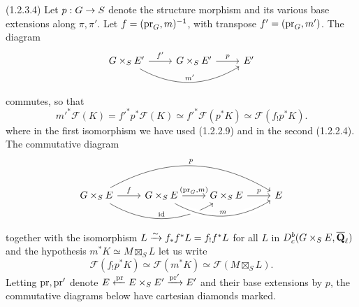 \documentclass[deligne.tex]{subfiles}
\begin{document}
(1.2.3.4) Let $p:G\rightarrow S$ denote the structure morphism and its various base
extensions along $\pi,\pi'$.
Let $f=(\operatorname{pr}_G,m)^{-1}$, with transpose $f'=(\operatorname{pr}_G,m')$. The diagram
\begin{equation*}\begin{tikzcd}
	G\times_SE'\arrow[r,"f'"]\arrow[rr,"m'",bend right]&G\times_SE'\arrow[r,"p"]&E'
\end{tikzcd}\end{equation*}
commutes, so that
\begin{equation*}
	m'^*\mathscr F(K)=f'^*p^*\mathscr F(K)
	\simeq f'^*\mathscr F(p^*K)
	\simeq\mathscr F(f_!p^*K).
\end{equation*}
where in the first isomorphism we have used (1.2.2.9) and in the second
(1.2.2.4). The commutative diagram
\begin{equation*}\begin{tikzcd}
	G\times_SE\arrow[rrr,"p",bend left]\arrow[rr,"\id",bend right]\arrow[r,"f"]
	&G\times_SE\arrow[rr,"m",bend right,crossing over]\arrow[r,"{(\pr_G,m)}"]
	&G\times_SE\arrow[r,"p"]&E
\end{tikzcd}\end{equation*}
together with the isomorphism $L\xrightarrow\sim f_*f^*L=f_!f^*L$ for all $L$ in 
$D_c^b(G\times_SE,\overline{\mathbf{Q}}_\ell)$ and the hypothesis
$m^*K\simeq M\boxtimes_SL$ let us write
\begin{equation*}
	\mathscr F(f_!p^*K)\simeq\mathscr F(m^*K)\simeq\mathscr F(M\boxtimes_SL).
\end{equation*}
Letting $\operatorname{pr},\operatorname{pr}'$ denote
$E\xleftarrow{\operatorname{pr}}E\times_S E'\xrightarrow{\operatorname{pr}'}E'$
and their base extensions by $p$, the commutative diagrams below have
cartesian diamonds marked.
\end{document}
